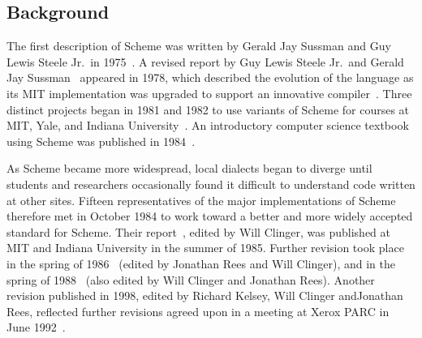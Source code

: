 \subsection*{Background}

\vest The first description of Scheme was written by Gerald Jay
Sussman and Guy Lewis Steele Jr.\ in
1975~\cite{Scheme75}.  A revised report by Guy Lewis Steele Jr.\ and
Gerald Jay Sussman~\cite{Scheme78}
 appeared in 1978, which described the evolution
of the language as its MIT implementation was upgraded to support an
innovative compiler~\cite{Rabbit}.  Three distinct projects began in
1981 and 1982 to use variants of Scheme for courses at MIT, Yale, and
Indiana University~\cite{Rees82,MITScheme,Scheme311}.  An introductory
computer science textbook using Scheme was published in
1984~\cite{SICP}.

\vest As Scheme became more widespread,
local dialects began to diverge until students and researchers
occasionally found it difficult to understand code written at other
sites.
Fifteen representatives of the major implementations of Scheme therefore
met in October 1984 to work toward a better and more widely accepted
standard for Scheme.
%
Their report~\cite{RRRS}, edited by Will Clinger,
was published at MIT and Indiana University in the summer of 1985.
Further revision took place in the spring of 1986~\cite{R3RS} (edited
by Jonathan Rees and Will Clinger),
and in the spring of 1988~\cite{R4RS} (also edited by Will Clinger and
Jonathan Rees).  Another revision published in 1998, edited
by Richard Kelsey, Will Clinger andJonathan Rees,
reflected further revisions agreed upon in a meeting at Xerox PARC in
June 1992~\cite{R5RS}.

